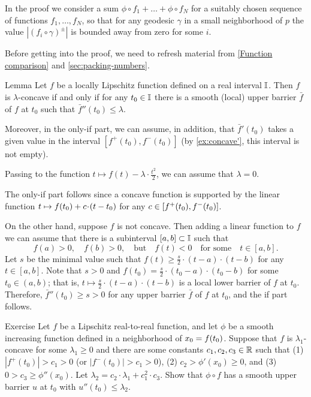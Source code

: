 In the proof we consider a sum $\phi\circ f_1+\ldots+\phi\circ f_N$ for a suitably chosen sequence of functions $f_1,\ldots,f_N$, so that for any geodesic $\gamma$ in a small neighborhood of $p$ the value $|(f_i\circ\gamma)^\pm|$ is bounded away from zero for some $i$.

\medskip

Before getting into the proof, we need to refresh material from \ref{Function comparison} and \ref{sec:packing-numbers}.

\begin{thm}{Lemma}\label{lem:barrier}
Let $f$ be a locally Lipschitz function defined on a real interval $\mathbb{I}$.
Then $f$ is $\lambda$-concave if and only if for any $t_0\in\mathbb{I}$ there is a smooth (local) upper barrier
$\bar f$ of $f$ at $t_0$ such that $\bar f''(t_0)\le \lambda$.

Moreover, in the only-if part, we can assume, in addition, that $\bar f'(t_0)$ takes a given value in the interval $[f^+(t_0),f^-(t_0)]$ (by \ref{ex:concave'}, this interval is not empty).
\end{thm}

Passing to the function $t\mapsto f(t)-\lambda\cdot\tfrac{t^2}2$, we can assume that $\lambda=0$.

The only-if part follows since a concave function is supported by the linear function $t\mapsto f(t_0)+ \Const\cdot (t-t_0)$ for any $c\in [f^+(t_0),f^-(t_0)]$.

On the other hand, suppose $f$ is not concave.
Then adding a linear function to $f$ we can assume that there is a subinterval $[a,b]\subset\mathbb{I}$ such that
\[
f(a)>0,
\quad
f(b)>0,
\quad\text{but}\quad
f(t)<0
\quad\text{for some}\quad
t\in [a,b].
\]
Let $s$ be the minimal value such that $f(t)\ge \tfrac s2\cdot (t-a)\cdot(t-b)$ for any $t\in [a,b]$.
Note that $s>0$ and $f(t_0)=\tfrac s2\cdot (t_0-a)\cdot(t_0-b)$ for some $t_0\in (a,b)$;
that is, $t\mapsto \tfrac s2\cdot (t-a)\cdot(t-b)$ is a local lower barrier of $f$ at $t_0$.
Therefore, $\bar f''(t_0)\ge s>0$ for any upper barrier $\bar f$ of $f$ at $t_0$,
and the if part follows.
\qeds

\begin{thm}[!]{Exercise}\label{ex:barrier}
Let $f$ be a Lipschitz real-to-real function, and let $\phi$ be a smooth increasing function defined in a neighborhood of $x_0\z=f(t_0)$.
Suppose that $f$ is $\lambda_1$-concave for some $\lambda_1\ge 0$ and there are some constants $c_1,c_2,c_3\in\mathbb{R}$ such that (1) $|f^+(t_0)|>c_1>0$ (or $|f^-(t_0)|>c_1>0$), (2) $c_2>\phi'(x_0)\ge 0$, and (3) $0>c_3\ge \phi''(x_0)$.
Let $\lambda_2=c_2\cdot\lambda_1+c_1^2\cdot c_3$.
Show that $\phi\circ f$ has a smooth upper barrier $u$ at $t_0$ with
$u''(t_0)\le \lambda_2$.


\end{thm}

